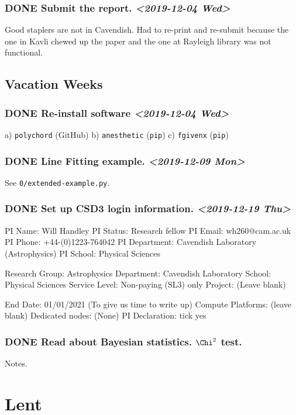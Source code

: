 \documentclass[11pt]{article}
\begin{document}
\subsubsection{{\bfseries\sffamily DONE} Submit the report. \textit{<2019-12-04 Wed>}}
\label{sec:org223da67}
Good staplers are not in Cavendish. Had to re-print and re-submit
because the one in Kavli chewed up the paper and the one at
Rayleigh library was not functional.
\subsection{Vacation Weeks}
\label{sec:org462f329}
\subsubsection{{\bfseries\sffamily DONE} Re-install software \textit{<2019-12-04 Wed>}}
\label{sec:org9a9c37c}
a) \texttt{polychord} (GitHub)
b) \texttt{anesthetic} (\texttt{pip})
c) \texttt{fgivenx} (\texttt{pip})
\subsubsection{{\bfseries\sffamily DONE} Line Fitting example. \textit{<2019-12-09 Mon>}}
\label{sec:org817ac56}
See \texttt{0/extended-example.py}. 
\subsubsection{{\bfseries\sffamily DONE} Set up CSD3 login information. \textit{<2019-12-19 Thu>}}
\label{sec:org2177e16}

PI Name: Will Handley
PI Status: Research fellow
PI Email: wh260@cam.ac.uk
PI Phone: +44-(0)1223-764042
PI Department: Cavendish Laboratory (Astrophysics)
PI School: Physical Sciences

Research Group: Astrophysics
Department: Cavendish Laboratory
School: Physical Sciences
Service Level: Non-paying (SL3) only
Project: (Leave blank)

End Date: 01/01/2021 (To give us time to write up)
Compute Platforms: (leave blank)
Dedicated nodes: (None)
PI Declaration: tick yes
\subsubsection{{\bfseries\sffamily DONE} Read about Bayesian statistics. \(\Chi^2\) test.}
\label{sec:org9720aa0}
Notes. 
\section{Lent}
\label{sec:orgfe4ae13}
\end{document}
